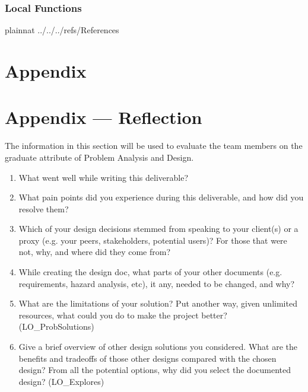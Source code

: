 \documentclass[12pt, titlepage]{article}
\begin{document}

\subsubsection{Local Functions}

 

\newpage

 {plainnat}
 {../../../refs/References}

\newpage

\section{Appendix} \label{Appendix}


\newpage{}

\section*{Appendix --- Reflection}


The information in this section will be used to evaluate the team members on the
graduate attribute of Problem Analysis and Design.



\begin{enumerate}
  \item What went well while writing this deliverable? 
  \item What pain points did you experience during this deliverable, and how
    did you resolve them?
  \item Which of your design decisions stemmed from speaking to your client(s)
  or a proxy (e.g. your peers, stakeholders, potential users)? For those that
  were not, why, and where did they come from?
  \item While creating the design doc, what parts of your other documents (e.g.
  requirements, hazard analysis, etc), it any, needed to be changed, and why?
  \item What are the limitations of your solution?  Put another way, given
  unlimited resources, what could you do to make the project better? (LO\_ProbSolutions)
  \item Give a brief overview of other design solutions you considered.  What
  are the benefits and tradeoffs of those other designs compared with the chosen
  design?  From all the potential options, why did you select the documented design?
  (LO\_Explores)
\end{enumerate}
\end{document}
